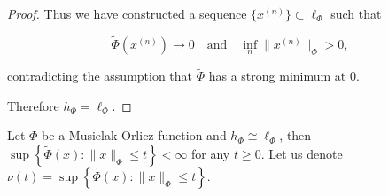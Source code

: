 \documentclass[12pt]{article}
\theoremstyle{thmstyleone}%
\newtheorem{lemma}[theorem]{Lemma}
\theoremstyle{thmstyletwo}%
\theoremstyle{thmstylethree}%
\begin{document}
{{\begin{proof}
Thus we have constructed a sequence $\{x^{(n)}\}\subset \ell_\Phi$ such that


\[
\widetilde{\Phi}(x^{(n)})\to 0
\quad\text{and}\quad
\inf_n \|x^{(n)}\|_\Phi > 0,
\]


contradicting the assumption that $\widetilde{\Phi}$ has a strong minimum at $0$.

Therefore $h_\Phi = \ell_\Phi$.
\end{proof}
}


 
Let $\Phi$ be a Musielak-Orlicz function and $h_\Phi\cong \ell_\Phi$, then $\sup\left\{\widetilde{\Phi}(x):\|x\|_\Phi\leq t\right\}<\infty$ for any $t\geq 0$. Let us denote $\nu(t)=\sup\left\{\widetilde{\Phi}(x):\|x\|_\Phi\leq t\right\}$. 

%	
%	

}
\end{document}
